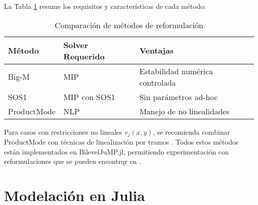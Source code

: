 La Tabla \ref{tab:comparacion_metodos} resume los requisitos y características de cada método:

\begin{table}[H]
\centering
\begin{tabular}{l|l|l}
\textbf{Método} & \textbf{Solver Requerido} & \textbf{Ventajas} \\ \hline
Big-M & MIP & Estabilidad numérica controlada \\
SOS1 & MIP con SOS1 & Sin parámetros ad-hoc \\
ProductMode & NLP & Manejo de no linealidades \\
\end{tabular}
\caption{Comparación de métodos de reformulación}
\label{tab:comparacion_metodos}
\end{table}

Para casos con restricciones no lineales $v_j(x,y)$, se recomienda combinar ProductMode con técnicas de linealización por tramos \cite[Apéndice B]{BilevelJump}. Todos estos métodos están implementados en BilevelJuMP.jl, permitiendo experimentación con reformulaciones que se pueden encontrqr en \cite[Sección 4]{BilevelJump}.

%
\section{Modelación en Julia}

